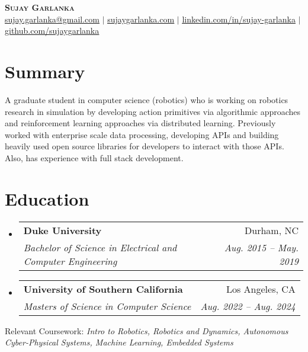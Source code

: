 \documentclass[letterpaper,10pt]{article}
\makeatletter
\newcommand{\resumeSubheading}[4]{
  \vspace{-2pt}\item
    \begin{tabular*}{0.97\textwidth}[t]{l@{\extracolsep{\fill}}r}
      \textbf{#1} & #2 \\
      \textit{\small#3} & \textit{\small #4} \\
    \end{tabular*}\vspace{-7pt}
}
\newcommand{\resumeSubHeadingListStart}{\begin{itemize}[leftmargin=0.15in, label={}]}
\newcommand{\resumeSubHeadingListEnd}{\end{itemize}}
\makeatother
\begin{document}

\begin{center}
    \textbf{\Huge \scshape Sujay Garlanka} \\ \vspace{1pt}
    \href{mailto:x@x.com}
    {\small \underline{sujay.garlanka@gmail.com}} $|$ 
    \href{https://www.sujaygarlanka.com}
    {\small \underline{sujaygarlanka.com}} $|$
    \href{https://www.linkedin.com/in/sujay-garlanka/}
    {\small \underline{linkedin.com/in/sujay-garlanka}} $|$
    \href{https://github.com/sujaygarlanka}
    {\small \underline{github.com/sujaygarlanka}}
\end{center}

\section{Summary}
    \small A graduate student in computer science (robotics) who is working on robotics research in simulation by developing action primitives via algorithmic approaches and reinforcement learning approaches via distributed learning. Previously worked with enterprise scale data processing, developing APIs and building heavily used open source libraries for developers to interact with those APIs. Also, has experience with full stack development. 

\section{Education}
  \resumeSubHeadingListStart
    \resumeSubheading
      {Duke University}{Durham, NC}
      {Bachelor of Science in Electrical and Computer Engineering}{Aug. 2015 -- May. 2019}
    \resumeSubheading
      {University of Southern California}{Los Angeles, CA}
      {Masters of Science in Computer Science}{Aug. 2022 -- Aug. 2024}
  \resumeSubHeadingListEnd
  Relevant Coursework: \emph{Intro to Robotics, Robotics and Dynamics, Autonomous Cyber-Physical Systems, Machine Learning, Embedded Systems}
\end{document}
